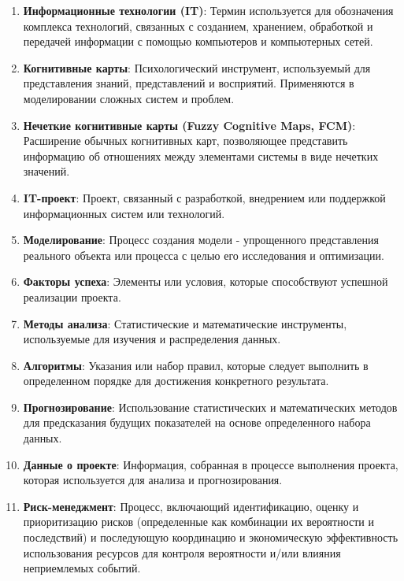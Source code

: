 \documentclass{article}
\begin{document}
    \begin{enumerate}
        \item \textbf{Информационные технологии (IT)}: Термин используется для обозначения комплекса технологий, связанных с созданием, хранением, обработкой и передачей информации с помощью компьютеров и компьютерных сетей.
        \item \textbf{Когнитивные карты}: Психологический инструмент, используемый для представления знаний, представлений и восприятий. Применяются в моделировании сложных систем и проблем.
        \item \textbf{Нечеткие когнитивные карты (Fuzzy Cognitive Maps, FCM)}: Расширение обычных когнитивных карт, позволяющее представить информацию об отношениях между элементами системы в виде нечетких значений.
        \item \textbf{IT-проект}: Проект, связанный с разработкой, внедрением или поддержкой информационных систем или технологий.
        \item \textbf{Моделирование}: Процесс создания модели - упрощенного представления реального объекта или процесса с целью его исследования и оптимизации.
        \item \textbf{Факторы успеха}: Элементы или условия, которые способствуют успешной реализации проекта.
        \item \textbf{Методы анализа}: Статистические и математические инструменты, используемые для изучения и распределения данных.
        \item \textbf{Алгоритмы}: Указания или набор правил, которые следует выполнить в определенном порядке для достижения конкретного результата.
        \item \textbf{Прогнозирование}: Использование статистических и математических методов для предсказания будущих показателей на основе определенного набора данных.
        \item \textbf{Данные о проекте}: Информация, собранная в процессе выполнения проекта, которая используется для анализа и прогнозирования.
        \item \textbf{Риск-менеджмент}: Процесс, включающий идентификацию, оценку и приоритизацию рисков (определенные как комбинации их вероятности и последствий) и последующую координацию и экономическую эффективность использования ресурсов для контроля вероятности и/или влияния неприемлемых событий.
    \end{enumerate}
\end{document}
